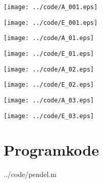 \texttt{[image: ../code/A\_001.eps]}

\vfill

\texttt{[image: ../code/E\_001.eps]}


\texttt{[image: ../code/A\_01.eps]}

\vfill

\texttt{[image: ../code/E\_01.eps]}


\texttt{[image: ../code/A\_02.eps]}

\vfill

\texttt{[image: ../code/E\_02.eps]}


\texttt{[image: ../code/A\_03.eps]}

\vfill

\texttt{[image: ../code/E\_03.eps]}


\clearpage
\section{Programkode} %
\label{sec:programkode}

  {../code/pendel.m}

